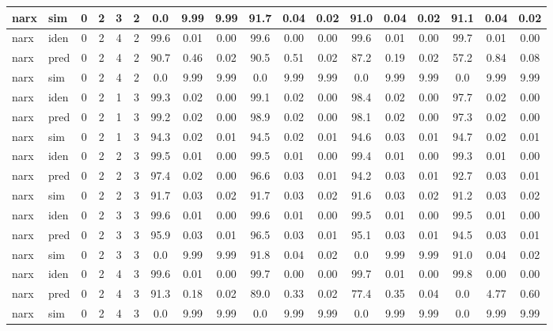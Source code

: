 \begin{landscape}
\begin{center}
\begin{longtable}{ll|cccc|ccc|ccc|ccc|ccc}
narx & sim  & 0 & 2 & 3 & 2 & 0.0 & 9.99 & 9.99 & 91.7 & 0.04 & 0.02 & 91.0 & 0.04 & 0.02 & 91.1 & 0.04 & 0.02 \\ 
 \hline 
narx & iden & 0 & 2 & 4 & 2 & 99.6 & 0.01 & 0.00 & 99.6 & 0.00 & 0.00 & 99.6 & 0.01 & 0.00 & 99.7 & 0.01 & 0.00 \\ 
narx & pred & 0 & 2 & 4 & 2 & 90.7 & 0.46 & 0.02 & 90.5 & 0.51 & 0.02 & 87.2 & 0.19 & 0.02 & 57.2 & 0.84 & 0.08 \\ 
narx & sim  & 0 & 2 & 4 & 2 & 0.0 & 9.99 & 9.99 & 0.0 & 9.99 & 9.99 & 0.0 & 9.99 & 9.99 & 0.0 & 9.99 & 9.99 \\ 
 \hline 
narx & iden & 0 & 2 & 1 & 3 & 99.3 & 0.02 & 0.00 & 99.1 & 0.02 & 0.00 & 98.4 & 0.02 & 0.00 & 97.7 & 0.02 & 0.00 \\ 
narx & pred & 0 & 2 & 1 & 3 & 99.2 & 0.02 & 0.00 & 98.9 & 0.02 & 0.00 & 98.1 & 0.02 & 0.00 & 97.3 & 0.02 & 0.00 \\ 
narx & sim  & 0 & 2 & 1 & 3 & 94.3 & 0.02 & 0.01 & 94.5 & 0.02 & 0.01 & 94.6 & 0.03 & 0.01 & 94.7 & 0.02 & 0.01 \\ 
 \hline 
narx & iden & 0 & 2 & 2 & 3 & 99.5 & 0.01 & 0.00 & 99.5 & 0.01 & 0.00 & 99.4 & 0.01 & 0.00 & 99.3 & 0.01 & 0.00 \\ 
narx & pred & 0 & 2 & 2 & 3 & 97.4 & 0.02 & 0.00 & 96.6 & 0.03 & 0.01 & 94.2 & 0.03 & 0.01 & 92.7 & 0.03 & 0.01 \\ 
narx & sim  & 0 & 2 & 2 & 3 & 91.7 & 0.03 & 0.02 & 91.7 & 0.03 & 0.02 & 91.6 & 0.03 & 0.02 & 91.2 & 0.03 & 0.02 \\ 
 \hline 
narx & iden & 0 & 2 & 3 & 3 & 99.6 & 0.01 & 0.00 & 99.6 & 0.01 & 0.00 & 99.5 & 0.01 & 0.00 & 99.5 & 0.01 & 0.00 \\ 
narx & pred & 0 & 2 & 3 & 3 & 95.9 & 0.03 & 0.01 & 96.5 & 0.03 & 0.01 & 95.1 & 0.03 & 0.01 & 94.5 & 0.03 & 0.01 \\ 
narx & sim  & 0 & 2 & 3 & 3 & 0.0 & 9.99 & 9.99 & 91.8 & 0.04 & 0.02 & 0.0 & 9.99 & 9.99 & 91.0 & 0.04 & 0.02 \\ 
 \hline 
narx & iden & 0 & 2 & 4 & 3 & 99.6 & 0.01 & 0.00 & 99.7 & 0.00 & 0.00 & 99.7 & 0.01 & 0.00 & 99.8 & 0.00 & 0.00 \\ 
narx & pred & 0 & 2 & 4 & 3 & 91.3 & 0.18 & 0.02 & 89.0 & 0.33 & 0.02 & 77.4 & 0.35 & 0.04 & 0.0 & 4.77 & 0.60 \\ 
narx & sim  & 0 & 2 & 4 & 3 & 0.0 & 9.99 & 9.99 & 0.0 & 9.99 & 9.99 & 0.0 & 9.99 & 9.99 & 0.0 & 9.99 & 9.99 \\ 
 \hline 
\end{longtable} 
\end{center} 
 \end{landscape}
